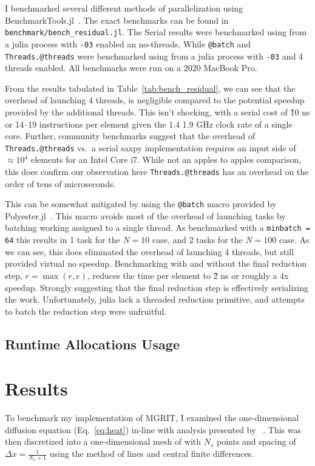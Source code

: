 \documentclass{article}
\begin{document}
I benchmarked several different methods of parallelization using BenchmarkTools.jl~\cite{BenchmarkTools.jl-2016}.
The exact benchmarks can be found in \verb!benchmark/bench_residual.jl!.
The Serial results were benchmarked using from a julia process with \verb!-03! enabled an no-threads, While \verb!@batch! and \verb!Threads.@threads! were benchmarked using from a julia process with \verb!-03! and 4 threads enabled.
All benchmarks were run on a 2020 MacBook Pro.

From the results tabulated in Table~\ref{tab:bench_residual}, we can see that the overhead of launching 4 threads, is negligible compared to the potential speedup provided by the additional threads.
This isn't shocking, with a serial cost of \~10 ns or 14--19 instructions per element given the 1.4 1.9 GHz clock rate of a single core.
Further, community benchmarks suggest that the overhead of \verb!Threads.@threads! vs.\ a serial saxpy implementation requires an input side of \(\approx 10^4\) elements for an Intel Core i7\cite{GccVsThreads2020}.
While not an apples to apples comparison, this does confirm our observation here \verb!Threads.@threads! has an overhead on the order of tens of microseconds.

This can be somewhat mitigated by using the \verb!@batch! macro provided by Polyester.jl~\cite{Polyester2022}.
This macro avoids most of the overhead of launching tasks by batching working assigned to a single thread.
As benchmarked with a \verb!minbatch = 64! this results in 1 task for the \(N = 10\) case, and 2 tasks for the \(N = 100\) case.
As we can see, this does eliminated the overhead of launching 4 threads, but still provided virtual no speedup.
Benchmarking with and without the final reduction step, \( r = \max(r, e) \), reduces the time per element to \~2 ns or roughly a 4x speedup.
Strongly suggesting that the final reduction step is effectively serializing the work.
Unfortunately, julia lack a threaded reduction primitive, and attempts to batch the reduction step were unfruitful.


\subsection{Runtime Allocations Usage}\label{sec:runtime_allocations}

\section{Results}

To benchmark my implementation of MGRIT, I examined the one-dimensional diffusion equation (Eq.~\ref{eq:heat}) in-line with analysis presented by \citeauthor{friedhoffMULTIGRIDINTIMEALGORITHMSOLVING}~\cite{friedhoffMULTIGRIDINTIMEALGORITHMSOLVING}.
This was then discretized into a one-dimensional mesh of with \(N_s\) points and spacing of \( \Delta x = \frac{1}{N_s + 1} \) using the method of lines and central finite differences.
\end{document}
